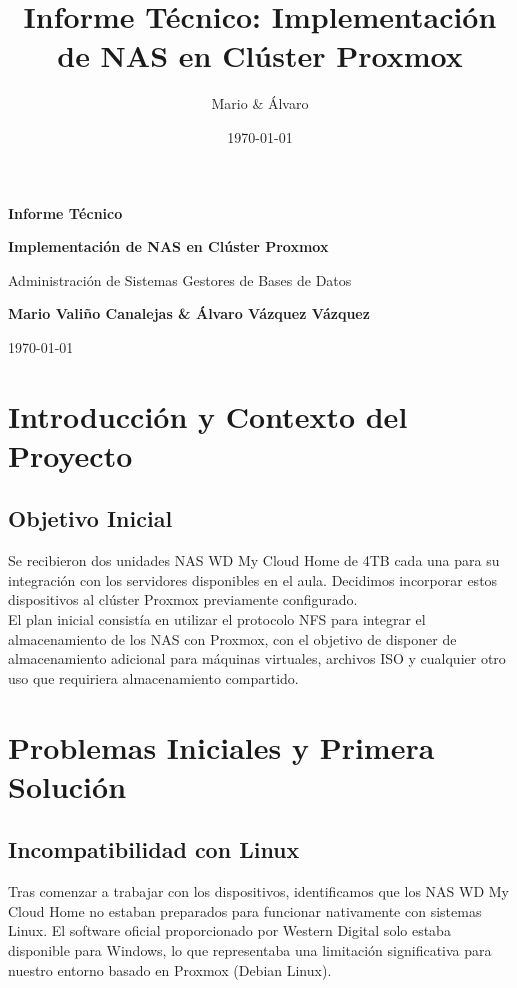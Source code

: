 \documentclass[12pt, a4paper]{article}
\title{\textbf{Informe Técnico: Implementación de NAS en Clúster Proxmox}}
\author{Mario \& Álvaro}
\date{\today}
\begin{document}
\begin{titlepage}
    \centering
    \vspace*{3cm}
    {\LARGE \textbf{Informe Técnico}\par}
    \vspace{0.4cm}
    {\Large \textbf{Implementación de NAS en Clúster Proxmox}\par}
    \vspace{1.5cm}
    {\large Administración de Sistemas Gestores de Bases de Datos\par}
    \vspace{0.5cm}
    {\large \textbf{Mario Valiño Canalejas \& Álvaro Vázquez Vázquez}\par}
    \vspace{0.2cm}
    {\large \today\par}
    \vfill
\end{titlepage}

\tableofcontents
\clearpage

\section{Introducción y Contexto del Proyecto}

\subsection{Objetivo Inicial}
Se recibieron dos unidades NAS WD My Cloud Home de 4TB cada una para su integración con los servidores disponibles en el aula. Decidimos incorporar estos dispositivos al clúster Proxmox previamente configurado. \\

El plan inicial consistía en utilizar el protocolo NFS para integrar el almacenamiento de los NAS con Proxmox, con el objetivo de disponer de almacenamiento adicional para máquinas virtuales, archivos ISO y cualquier otro uso que requiriera almacenamiento compartido.

\section{Problemas Iniciales y Primera Solución}

\subsection{Incompatibilidad con Linux}
Tras comenzar a trabajar con los dispositivos, identificamos que los NAS WD My Cloud Home no estaban preparados para funcionar nativamente con sistemas Linux. El software oficial proporcionado por Western Digital solo estaba disponible para Windows, lo que representaba una limitación significativa para nuestro entorno basado en Proxmox (Debian Linux).
\end{document}
